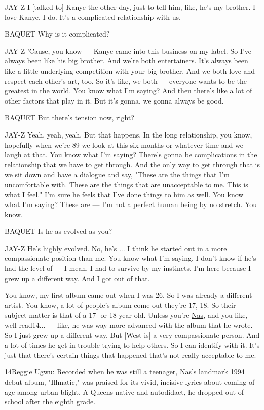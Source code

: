 JAY-Z I {[}talked to{]} Kanye the other day, just to tell him, like,
he's my brother. I love Kanye. I do. It's a complicated relationship
with us.

BAQUET Why is it complicated?

JAY-Z 'Cause, you know --- Kanye came into this business on my label. So
I've always been like his big brother. And we're both entertainers. It's
always been like a little underlying competition with your big brother.
And we both love and respect each other's art, too. So it's like, we
both --- everyone wants to be the greatest in the world. You know what
I'm saying? And then there's like a lot of other factors that play in
it. But it's gonna, we gonna always be good.

BAQUET But there's tension now, right?

JAY-Z Yeah, yeah, yeah. But that happens. In the long relationship, you
know, hopefully when we're 89 we look at this six months or whatever
time and we laugh at that. You know what I'm saying? There's gonna be
complications in the relationship that we have to get through. And the
only way to get through that is we sit down and have a dialogue and say,
"These are the things that I'm uncomfortable with. These are the things
that are unacceptable to me. This is what I feel." I'm sure he feels
that I've done things to him as well. You know what I'm saying? These
are --- I'm not a perfect human being by no stretch. You know.

BAQUET Is he as evolved as you?

JAY-Z He's highly evolved. No, he's ... I think he started out in a more
compassionate position than me. You know what I'm saying. I don't know
if he's had the level of --- I mean, I had to survive by my instincts.
I'm here because I grew up a different way. And I got out of that.

You know, my first album came out when I was 26. So I was already a
different artist. You know, a lot of people's album come out they're 17,
18. So their subject matter is that of a 17- or 18-year-old. Unless
you're \href{https://www.nytimes3xbfgragh.onion/topic/person/nas}{Nas},
and you like, well-read14... --- like, he was way more advanced with the
album that he wrote. So I just grew up a different way. But {[}West
is{]} a very compassionate person. And a lot of times he get in trouble
trying to help others. So I can identify with it. It's just that there's
certain things that happened that's not really acceptable to me.

14Reggie Ugwu: Recorded when he was still a teenager, Nas's landmark
1994 debut album, "Illmatic," was praised for its vivid, incisive lyrics
about coming of age among urban blight. A Queens native and autodidact,
he dropped out of school after the eighth grade.

